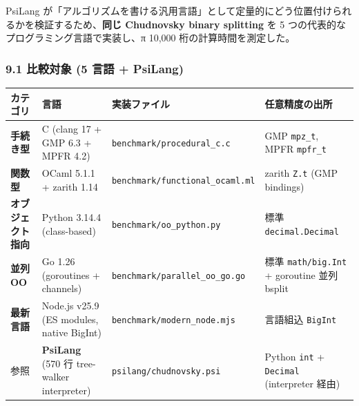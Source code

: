 \documentclass[
]{ltjsarticle}
\newcounter{none} %
\begin{document}
PsiLang
が「アルゴリズムを書ける汎用言語」として定量的にどう位置付けられるかを検証するため、\textbf{同じ
Chudnovsky binary splitting} を 5
つの代表的なプログラミング言語で実装し、π 10,000
桁の計算時間を測定した。

\subsubsection{9.1 比較対象 (5 言語 +
PsiLang)}\label{ux6bd4ux8f03ux5bfeux8c61-5-ux8a00ux8a9e-psilang}

{\def\LTcaptype{none} %
\begin{longtable}[]{@{}
  >{\raggedright\arraybackslash}p{}
  >{\raggedright\arraybackslash}p{}
  >{\raggedright\arraybackslash}p{}
  >{\raggedright\arraybackslash}p{}@{}}
\toprule\noalign{}
\begin{minipage}[b]{\linewidth}\raggedright
カテゴリ
\end{minipage} & \begin{minipage}[b]{\linewidth}\raggedright
言語
\end{minipage} & \begin{minipage}[b]{\linewidth}\raggedright
実装ファイル
\end{minipage} & \begin{minipage}[b]{\linewidth}\raggedright
任意精度の出所
\end{minipage} \\
\midrule\noalign{}
\endhead
\bottomrule\noalign{}
\endlastfoot
\textbf{手続き型} & C (clang 17 + GMP 6.3 + MPFR 4.2) &
\texttt{benchmark/procedural\_c.c} & GMP \texttt{mpz\_t}, MPFR
\texttt{mpfr\_t} \\
\textbf{関数型} & OCaml 5.1.1 + zarith 1.14 &
\texttt{benchmark/functional\_ocaml.ml} & zarith \texttt{Z.t} (GMP
bindings) \\
\textbf{オブジェクト指向} & Python 3.14.4 (class-based) &
\texttt{benchmark/oo\_python.py} & 標準 \texttt{decimal.Decimal} \\
\textbf{並列 OO} & Go 1.26 (goroutines + channels) &
\texttt{benchmark/parallel\_oo\_go.go} & 標準 \texttt{math/big.Int} +
goroutine 並列 bsplit \\
\textbf{最新言語} & Node.js v25.9 (ES modules, native BigInt) &
\texttt{benchmark/modern\_node.mjs} & 言語組込 \texttt{BigInt} \\
参照 & \textbf{PsiLang} (570 行 tree-walker interpreter) &
\texttt{psilang/chudnovsky.psi} & Python \texttt{int} + \texttt{Decimal}
(interpreter 経由) \\
\end{longtable}
}
\end{document}
